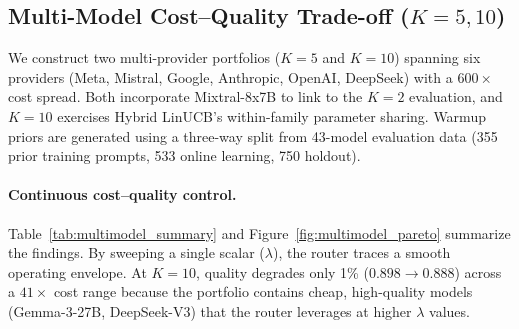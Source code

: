 
\subsection{Multi-Model Cost--Quality Trade-off ($K{=}5, 10$)}
\label{sec:multimodel}

We construct two multi-provider portfolios ($K{=}5$ and $K{=}10$) spanning six providers (Meta, Mistral, Google, Anthropic, OpenAI, DeepSeek) with a $600\times$ cost spread. Both incorporate Mixtral-8x7B to link to the $K{=}2$ evaluation, and $K{=}10$ exercises Hybrid LinUCB's within-family parameter sharing. Warmup priors are generated using a three-way split from 43-model evaluation data (355 prior training prompts, 533 online learning, 750 holdout).



\paragraph{Continuous cost--quality control.}
Table~\ref{tab:multimodel_summary} and Figure~\ref{fig:multimodel_pareto} summarize the findings. By sweeping a single scalar ($\lambda$), the router traces a smooth operating envelope. At $K{=}10$, quality degrades only 1\% ($0.898 \to 0.888$) across a $41\times$ cost range because the portfolio contains cheap, high-quality models (Gemma-3-27B, DeepSeek-V3) that the router leverages at higher $\lambda$ values.

\begin{table}[h]
\centering
\caption{Multi-model routing summary (mean judge agreement). Gap closure is relative to the weakest model. Mean $\pm$ std ($n{=}20$).}
\label{tab:multimodel_summary}
\small
{}
\end{table}


